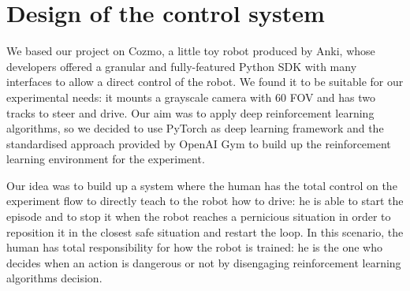 \documentclass[10pt,twocolumn,letterpaper]{article}
\begin{document}

\section{Design of the control system}

We based our project on Cozmo, a little toy robot produced by Anki, whose developers offered a granular and fully-featured Python SDK with many interfaces to allow a direct control of the robot.
We found it to be suitable for our experimental needs: it mounts a grayscale camera with 60 FOV and has two tracks to steer and drive.
Our aim was to apply deep reinforcement learning algorithms, so we decided to use PyTorch as deep learning framework and the standardised approach provided by OpenAI Gym to build up the reinforcement learning environment for the experiment.

Our idea was to build up a system where the human has the total control on the experiment flow to directly teach to the robot how to drive: he is able to start the episode and to stop it when the robot reaches a pernicious situation in order to reposition it in the closest safe situation and restart the loop. In this scenario, the human has total responsibility for how the robot is trained: he is the one who decides when an action is dangerous or not by disengaging reinforcement learning algorithms decision.
\end{document}
